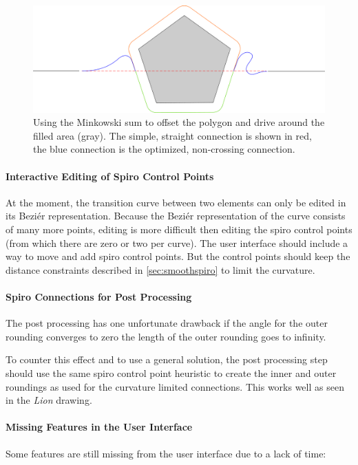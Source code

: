 \begin{figure}
\includegraphics[width=\textwidth]{images/conclusion/minkowski_crossing_avoidance.pdf}
\caption{Using the Minkowski sum to offset the polygon and drive around the filled area (gray). The simple, straight connection is shown in red, the blue connection is the optimized, non-crossing connection.}\label{fig:super_conn}
\end{figure}

\paragraph{Interactive Editing of Spiro Control Points} At the moment, the transition curve between two elements can only be edited in its Beziér representation. Because the Beziér representation of the curve consists of many more points, editing is more difficult then editing the spiro control points (from which there are zero or two per curve). The user interface should include a way to move and add spiro control points. But the control points should keep the distance constraints described in \autoref{sec:smoothspiro} to limit the curvature.

\paragraph{Spiro Connections for Post Processing}

The post processing has one unfortunate drawback if the angle for the outer rounding converges to zero the length of the outer rounding goes to infinity.

To counter this effect and to use a general solution, the post processing step should use the same spiro control point heuristic to create the inner and outer roundings as used for the curvature limited connections. This works well as seen in the \textit{Lion} drawing.

\paragraph{Missing Features in the User Interface} Some features are still missing from the user interface due to a lack of time: 

